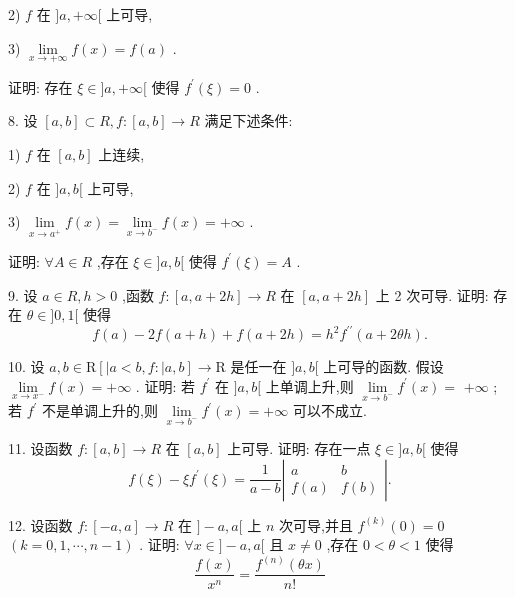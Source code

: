 2) $f$ 在 $\rbrack a, + \infty \lbrack$ 上可导,

3) $\mathop{\lim }\limits_{{x \rightarrow   + \infty }}f\left( x\right)  = f\left( a\right)$ .

证明: 存在 $\xi  \in  \rbrack a, + \infty \lbrack$ 使得 ${f}^{\prime }\left( \xi \right)  = 0$ .

8. 设 $\left\lbrack  {a,b}\right\rbrack   \subset  R,f : \left\lbrack  {a,b}\right\rbrack   \rightarrow  R$ 满足下述条件:

1) $f$ 在 $\left\lbrack  {a,b}\right\rbrack$ 上连续,

2) $f$ 在 $\rbrack a,b\lbrack$ 上可导,

3) $\mathop{\lim }\limits_{{x \rightarrow  {a}^{ + }}}f\left( x\right)  = \mathop{\lim }\limits_{{x \rightarrow  {b}^{ - }}}f\left( x\right)  =  + \infty$ .

证明: $\forall A \in  R$ ,存在 $\xi  \in  \rbrack a,b\lbrack$ 使得 ${f}^{\prime }\left( \xi \right)  = A$ .

9. 设 $a \in  R,h > 0$ ,函数 $f : \left\lbrack  {a,a + {2h}}\right\rbrack   \rightarrow  R$ 在 $\left\lbrack  {a,a + {2h}}\right\rbrack$ 上 2 次可导. 证明: 存在 $\theta  \in  \rbrack 0,1\lbrack$ 使得
$$f\left( a\right)  - {2f}\left( {a + h}\right)  + f\left( {a + {2h}}\right)  = {h}^{2}{f}^{\prime \prime }\left( {a + {2\theta h}}\right) .$$

10. 设 $a,b \in  \mathrm{R}\left\lbrack  {\left| {a < b,f : }\right| a,b}\right\rbrack   \rightarrow  \mathrm{R}$ 是任一在 $\rbrack a,b\lbrack$ 上可导的函数. 假设 $\mathop{\lim }\limits_{{x \rightarrow  {x}^{ - }}}f\left( x\right)  =  + \infty$ . 证明: 若 ${f}^{\prime }$ 在 $\rbrack a,b\lbrack$ 上单调上升,则 $\mathop{\lim }\limits_{{x \rightarrow  {b}^{ - }}}{f}^{\prime }\left( x\right)  =$  $+ \infty$ ; 若 ${f}^{\prime }$ 不是单调上升的,则 $\mathop{\lim }\limits_{{x \rightarrow  {b}^{ - }}}{f}^{\prime }\left( x\right)  =  + \infty$ 可以不成立.

11. 设函数 $f : \left\lbrack  {a,b}\right\rbrack   \rightarrow  R$ 在 $\left\lbrack  {a,b}\right\rbrack$ 上可导. 证明: 存在一点 $\xi  \in  \rbrack a,b\lbrack$ 使得
$$f\left( \xi \right)  - \xi {f}^{\prime }\left( \xi \right)  = \frac{1}{a - b}\left| \begin{array}{ll} a & b \\  f\left( a\right) & f\left( b\right)  \end{array}\right| .$$

12. 设函数 $f : \left\lbrack  {-a,a}\right\rbrack   \rightarrow  R$ 在 $\rbrack  - a,a\lbrack$ 上 $n$ 次可导,并且 ${f}^{\left( k\right) }\left( 0\right)  = 0$  $\left( {k = 0,1,\cdots ,n - 1}\right)$ . 证明: $\forall x \in  \rbrack  - a,a\lbrack$ 且 $x \neq  0$ ,存在 $0 < \theta  < 1$ 使得
$$\frac{f\left( x\right) }{{x}^{n}} = \frac{{f}^{\left( n\right) }\left( {\theta x}\right) }{n!}$$

